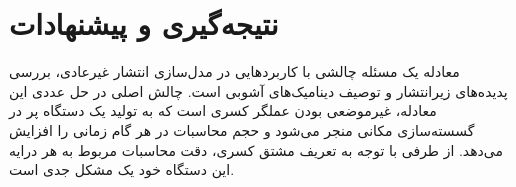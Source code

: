 \chapter*{نتیجه‌گیری و پیشنهادات}
\thispagestyle{empty}
معادله
یک مسئله چالشی با کاربردهایی در مدل‌سازی انتشار غیرعادی، بررسی پدیده‌های زیرانتشار و توصیف دینامیک‌های آشوبی است.
چالش اصلی در حل عددی این معادله، غیرموضعی بودن عملگر کسری است که به تولید یک دستگاه پر در گسسته‌سازی مکانی منجر می‌شود و حجم محاسبات در هر گام زمانی را افزایش می‌دهد.
از طرفی با توجه به تعریف مشتق کسری، دقت محاسبات مربوط به هر درایه این دستگاه خود یک مشکل جدی است.